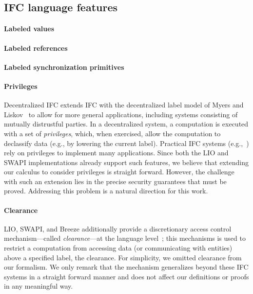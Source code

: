 \documentclass{sigplanconf}
\begin{document}
\subsection{IFC language features}
\label{sec:extensions:labeled}

\paragraph{Labeled values}
\paragraph{Labeled references}
\paragraph{Labeled synchronization primitives}

\paragraph{Privileges}
Decentralized IFC extends IFC with the decentralized label model of
Myers and Liskov~\cite{myers:dlm} to allow for more general
applications, including systems consisting of mutually distrustful
parties.  In a decentralized system, a computation is executed with a
set of \emph{privileges}, which, when exercised, allow the computation
to declassify data (e.g., by lowering the current label).
%
Practical IFC systems
(e.g.,~\cite{Zeldovich:2006, lio,
Hritcu:2013:YIB:2497621.2498098, myers:jif}) rely on privileges to
implement many applications.
%
Since both the LIO and SWAPI implementations already support such features,
we believe that extending our calculus to consider privileges is
straight forward.
%
However, the challenge with such an extension lies in the precise
security guarantees that must be proved.
%
Addressing this problem is a natural direction for this work.

\paragraph{Clearance}
%
LIO, SWAPI, and Breeze additionally provide a discretionary access
control mechanism---called \emph{clearance}---at the language
level~\cite{Hritcu:2013:YIB:2497621.2498098, lio}; this mechanisms is
used to restrict a computation from accessing data (or communicating
with entities) above a specified label, the clearance.
%
For simplicity, we omitted clearance from our formalism.
%
We only remark that the mechanism generalizes beyond these IFC systems
in a straight forward manner and does not affect our definitions or
proofs in any meaningful way.
\end{document}
